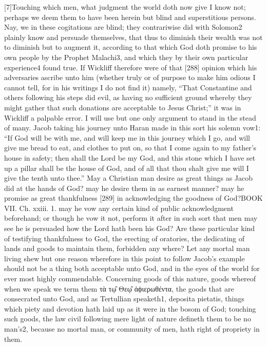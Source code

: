 [7]Touching which men, what judgment the world doth now give I know not; perhaps we deem them to have been herein but blind and superstitious persons. Nay, we in these cogitations are blind; they contrariwise did with Solomon2 plainly know and persuade themselves, that thus to diminish their wealth was not to diminish but to augment it, according to that which God doth promise to his own people by the Prophet Malachi3, and which they by their own particular experience4 found true. If Wickliff therefore were of that [288] opinion which his adversaries ascribe unto him (whether truly or of purpose to make him odious I cannot tell, for in his writings I do not find it) namely, “That Constantine and others following his steps did evil, as having no sufficient ground whereby they might gather that such donations are acceptable to Jesus Christ;” it was in Wickliff a palpable error. I will use but one only argument to stand in the stead of many. Jacob taking his journey unto Haran made in this sort his solemn vow1: “If God will be with me, and will keep me in this journey which I go, and will give me bread to eat, and clothes to put on, so that I come again to my father’s house in safety; then shall the Lord be my God, and this stone which I have set up a pillar shall be the house of God, and of all that thou shalt give me will I give the tenth unto thee.” May a Christian man desire as great things as Jacob did at the hands of God? may he desire them in as earnest manner? may he promise as great thankfulness [289] in acknowledging the goodness of God?BOOK VII. Ch. xxiii. 1. may he vow any certain kind of public acknowledgment beforehand; or though he vow it not, perform it after in such sort that men may see he is persuaded how the Lord hath been his God? Are these particular kind of testifying thankfulness to God, the erecting of oratories, the dedicating of lands and goods to maintain them, forbidden any where? Let any mortal man living shew but one reason wherefore in this point to follow Jacob’s example should not be a thing both acceptable unto God, and in the eyes of the world for ever most highly commendable. Concerning goods of this nature, goods whereof when we speak we term them τὰ τῳ̑ Θεῳ̑ ἀϕιερωθέντα, the goods that are consecrated unto God, and as Tertullian speaketh1, deposita pietatis, things which piety and devotion hath laid up as it were in the bosom of God; touching such goods, the law civil following mere light of nature defineth them to be no man’s2, because no mortal man, or community of men, hath right of propriety in them.

